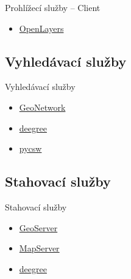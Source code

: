 \documentclass{beamer}
\begin{document}
\begin{frame}{Prohlížecí služby -- Client}
    \begin{itemize}
        \item \href{http://openlayers.org}{OpenLayers}
    \end{itemize}
\end{frame}

\subsection{Vyhledávací služby}
\begin{frame}{Vyhledávací služby}
    \begin{itemize}
        \item \href{http://geonetwork-opensource.org}{GeoNetwork}
        \item \href{http://deegree.org}{deegree}
        \item \href{http://pycsw.org}{pycsw}
    \end{itemize}
\end{frame}

\subsection{Stahovací služby}
\begin{frame}{Stahovací služby}
    \begin{itemize}
        \item \href{http://geoserver.org}{GeoServer}
        \item \href{http://mapserver.org}{MapServer}
        \item \href{http://deegree.org}{deegree}
    \end{itemize}
\end{frame}
\end{document}
